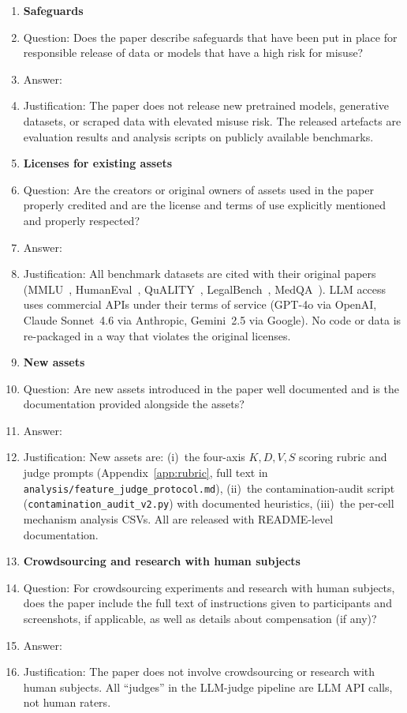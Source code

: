 \begin{enumerate}
\item {\bf Safeguards}
    \item[] Question: Does the paper describe safeguards that have been put in place for responsible release of data or models that have a high risk for misuse?
    \item[] Answer: \answerNA{}
    \item[] Justification: The paper does not release new pretrained models, generative datasets, or scraped data with elevated misuse risk. The released artefacts are evaluation results and analysis scripts on publicly available benchmarks.

\item {\bf Licenses for existing assets}
    \item[] Question: Are the creators or original owners of assets used in the paper properly credited and are the license and terms of use explicitly mentioned and properly respected?
    \item[] Answer: \answerYes{}
    \item[] Justification: All benchmark datasets are cited with their original papers (MMLU~\citep{hendrycks2021mmlu}, HumanEval~\citep{chen2021humaneval}, QuALITY~\citep{pang2022quality}, LegalBench~\citep{guha2023legalbench}, MedQA~\citep{jin2021medqa}). LLM access uses commercial APIs under their terms of service (GPT-4o via OpenAI, Claude Sonnet~4.6 via Anthropic, Gemini~2.5 via Google). No code or data is re-packaged in a way that violates the original licenses.

\item {\bf New assets}
    \item[] Question: Are new assets introduced in the paper well documented and is the documentation provided alongside the assets?
    \item[] Answer: \answerYes{}
    \item[] Justification: New assets are: (i)~the four-axis $K{,}D{,}V{,}S$ scoring rubric and judge prompts (Appendix~\ref{app:rubric}, full text in \texttt{analysis/feature\_judge\_protocol.md}), (ii)~the contamination-audit script (\texttt{contamination\_audit\_v2.py}) with documented heuristics, (iii)~the per-cell mechanism analysis CSVs. All are released with README-level documentation.

\item {\bf Crowdsourcing and research with human subjects}
    \item[] Question: For crowdsourcing experiments and research with human subjects, does the paper include the full text of instructions given to participants and screenshots, if applicable, as well as details about compensation (if any)?
    \item[] Answer: \answerNA{}
    \item[] Justification: The paper does not involve crowdsourcing or research with human subjects. All ``judges'' in the LLM-judge pipeline are LLM API calls, not human raters.


\end{enumerate}
